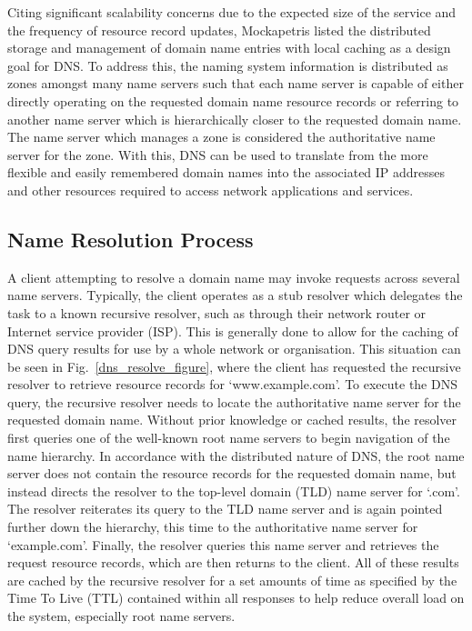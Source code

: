 Citing significant scalability concerns due to the expected size of the service and the frequency of resource record updates, Mockapetris listed the distributed storage and management of domain name entries with local caching as a design goal for DNS. To address this, the naming system information is distributed as zones amongst many name servers such that each name server is capable of either directly operating on the requested domain name resource records or referring to another name server which is hierarchically closer to the requested domain name. The name server which manages a zone is considered the authoritative name server for the zone. With this, DNS can be used to translate from the more flexible and easily remembered domain names into the associated IP addresses and other resources required to access network applications and services.

\subsection{Name Resolution Process}

A client attempting to resolve a domain name may invoke requests across several name servers. Typically, the client operates as a stub resolver which delegates the task to a known recursive resolver, such as through their network router or Internet service provider (ISP). This is generally done to allow for the caching of DNS query results for use by a whole network or organisation. This situation can be seen in Fig.~\ref{dns_resolve_figure}, where the client has requested the recursive resolver to retrieve resource records for `www.example.com'. To execute the DNS query, the recursive resolver needs to locate the authoritative name server for the requested domain name. Without prior knowledge or cached results, the resolver first queries one of the well-known root name servers to begin navigation of the name hierarchy. In accordance with the distributed nature of DNS, the root name server does not contain the resource records for the requested domain name, but instead directs the resolver to the top-level domain (TLD) name server for `.com'. The resolver reiterates its query to the TLD name server and is again pointed further down the hierarchy, this time to the authoritative name server for `example.com'. Finally, the resolver queries this name server and retrieves the request resource records, which are then returns to the client. All of these results are cached by the recursive resolver for a set amounts of time as specified by the Time To Live (TTL) contained within all responses to help reduce overall load on the system, especially root name servers.

